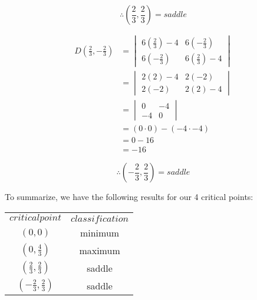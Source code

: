 \documentclass{article}
\begin{document}
\begin{enumerate}[a.]
	\[\therefore \left(\frac{2}{3},\frac{2}{3}\right) = saddle\]
	
	\begin{equation}
    \begin{split}
        D\left(\frac{2}{3},-\frac{2}{3}\right)&=\begin{vmatrix}6(\frac{2}{3})-4&6(-\frac{2}{3})\\6(-\frac{2}{3})&6(\frac{2}{3})-4\end{vmatrix} \\
    	&=\begin{vmatrix}2(2)-4&2(-2)\\2(-2)&2(2)-4\end{vmatrix}\\
    	&=\begin{vmatrix}0&-4\\-4&0\end{vmatrix}\\
    	&=(0\cdot0)-(-4\cdot-4)\\
    	&=0-16\\
    	&=-16
    \end{split}
	\end{equation}
	
	\[\therefore \left(-\frac{2}{3},\frac{2}{3}\right) = saddle\]
	
	To summarize, we have the following results for our 4 critical points:
	
	\begin{center}
     \begin{tabular}{||c | c||}
     \hline
     $critical point$ & $classification$ \\ [0.5ex]
     $(0,0)$ & minimum \\
     $\left(0,\frac{4}{3}\right)$ & maximum \\
     $\left(\frac{2}{3},\frac{2}{3}\right)$ & saddle \\
     $\left(-\frac{2}{3},\frac{2}{3}\right)$ & saddle \\ [1ex]
     \hline
    \end{tabular}
    \end{center}
	
\end{enumerate}
\end{document}
